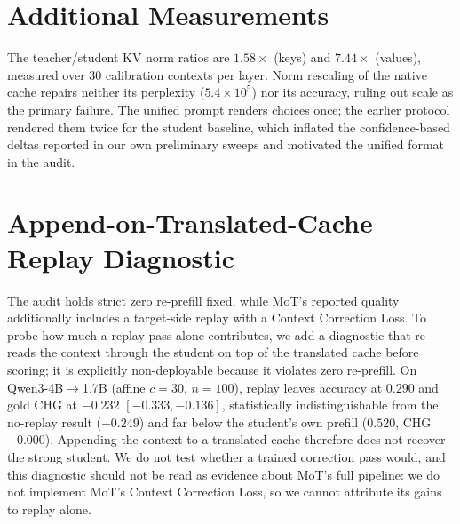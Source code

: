 \documentclass{article} %
\begin{document}
\section{Additional Measurements}
The teacher/student KV norm ratios are $1.58\times$ (keys) and $7.44\times$
(values), measured over 30 calibration contexts per layer. Norm rescaling of
the native cache repairs neither its perplexity ($5.4\times10^{5}$) nor its
accuracy, ruling out scale as the primary failure. The unified prompt
renders choices once; the earlier protocol rendered them twice for the
student baseline, which inflated the confidence-based deltas reported in our
own preliminary sweeps and motivated the unified format in the audit.


\section{Append-on-Translated-Cache Replay Diagnostic}
\label{app:replay}
The audit holds strict zero re-prefill fixed, while MoT's reported quality
additionally includes a target-side replay with a Context Correction Loss. To
probe how much a replay pass alone contributes, we add a diagnostic that
re-reads the context through the student on top of the translated cache before
scoring; it is explicitly non-deployable because it violates zero re-prefill.
On Qwen3-4B$\to$1.7B (affine $c{=}30$, $n{=}100$), replay leaves accuracy at
$0.290$ and gold CHG at $-0.232$ $[-0.333, -0.136]$, statistically
indistinguishable from the no-replay result ($-0.249$) and far below the
student's own prefill ($0.520$, CHG $+0.000$). Appending the context to a
translated cache therefore does not recover the strong student. We do not test
whether a trained correction pass would, and this diagnostic should not be read
as evidence about MoT's full pipeline: we do not implement MoT's Context
Correction Loss, so we cannot attribute its gains to replay alone.
\end{document}
